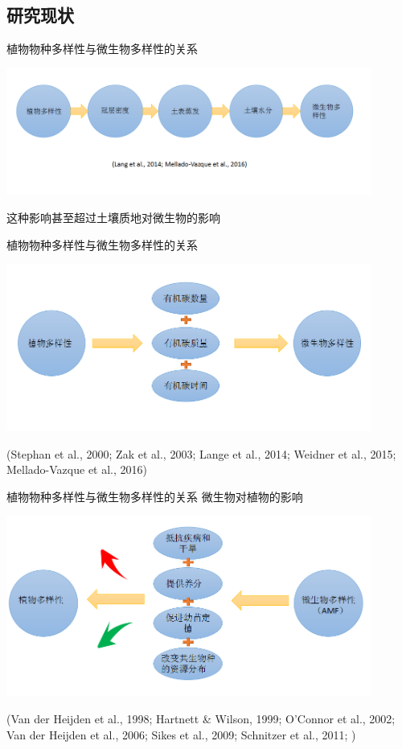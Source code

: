 \subsection{研究现状}
\begin{frame}{\insertsubsection}
	植物物种多样性与微生物多样性的关系
	\begin{center}
		\includegraphics[width = 0.9\textwidth]{./pic/1.2.1.png}
	\end{center}
	这种影响甚至超过土壤质地对微生物的影响
\end{frame}
\begin{frame}{\insertsubsection}
	植物物种多样性与微生物多样性的关系
	\begin{center}
		\includegraphics[width = 0.9\textwidth]{./pic/1.2.2.png}
	\end{center}
	(Stephan et al., 2000; Zak et al., 2003; Lange et al., 2014; Weidner et al., 2015; Mellado-Vazque et al., 2016)
\end{frame}
\begin{frame}{\insertsubsection}
	植物物种多样性与微生物多样性的关系
	微生物对植物的影响
		\begin{center}
			\includegraphics[width = 0.9\textwidth]{./pic/1.2.3.png}
		\end{center}
		(Van der Heijden et al., 1998; Hartnett \&  Wilson, 1999; O'Connor et al., 2002; Van der Heijden et al., 2006; Sikes et al., 2009; Schnitzer et al., 2011; )
\end{frame}
